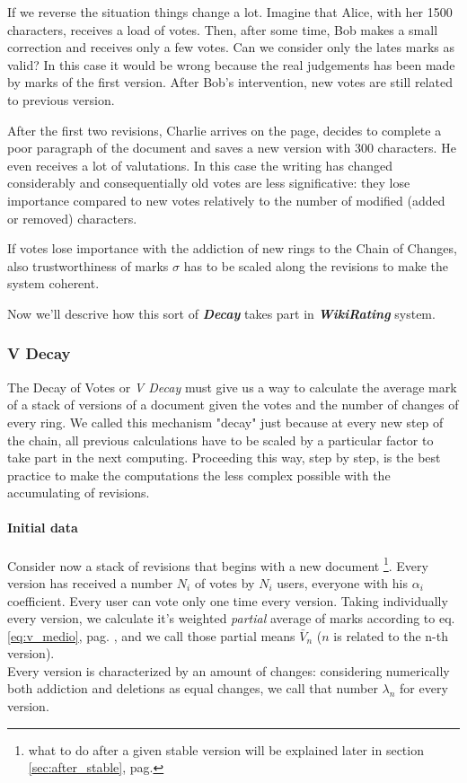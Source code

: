 \documentclass[a4paper,11pt]{article}
\newcommand{\wir}{\textbf{\textit{WikiRating }}}
\newcommand{\sg}{$\sigma$ }
\newcommand{\pb}[1]{$\bar{V}_#1$ }
\begin{document}
If we reverse the situation things change a lot. Imagine that Alice, with her 1500 
characters, receives a load of votes. Then, after some time, Bob makes a small correction 
and receives only a few votes. Can we consider only the lates marks as valid? In this case 
it would be wrong because the real judgements has been made by marks of the first 
version. After Bob's intervention, new votes are still related to previous version.

After the first two revisions, Charlie arrives on the page, decides to complete a poor 
paragraph of the document and saves a new version with 300 characters. He even receives a 
lot of valutations. In this case the writing has changed considerably and consequentially 
old votes are less significative: they lose importance compared to new votes relatively to 
the number of modified (added or removed) characters.

If votes lose importance with the addiction of new rings to the Chain of Changes, also 
trustworthiness of marks \sg has to be scaled along the revisions to make the system 
coherent. 

Now we'll descrive how this sort of \textit{\textbf{Decay}} takes part in \wir system.

\subsubsection{V Decay} \label{sec:v_decay}
The Decay of Votes or \emph{V Decay} must give us a way to calculate the average mark of a 
stack of versions of a document given the votes and the number of changes of every ring.
We called this mechanism "decay" just because at every new step of the chain, all previous 
calculations have to be scaled by a particular factor to take part in the next computing. 
Proceeding this way, step by step, is the best practice to make the computations the less 
complex possible with the accumulating of revisions.

\paragraph{Initial data} Consider now a stack of revisions that begins with a new document \footnote{what to do after a given stable version will be explained later in section \ref{sec:after_stable}, pag. \pageref{sec:after_stable}}. 
Every version has received a number $N_i$ of votes by $N_i$ users, everyone with his $
\alpha_i$ coefficient. Every user can vote only one time every version. Taking individually every version, we calculate it's weighted 
\emph{partial} average of marks according to eq. \ref{eq:v_medio}, pag. 
\pageref{eq:v_medio}, and we call those partial means \pb{n} ($n$ is related to the n-th version).\\
Every version is characterized by an amount of changes: considering numerically both 
addiction and deletions as equal changes, we call that number $\lambda_n$ for every 
version.
\end{document}
